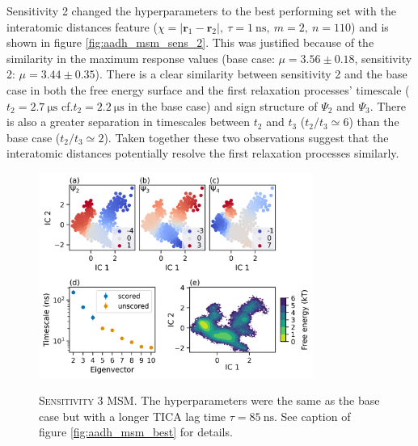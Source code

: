 Sensitivity 2 changed the hyperparameters to the best performing set with the interatomic distances feature ($\chi = |\mathbf{r}_{1} - \mathbf{r}_{2}|,\ \tau = \SI{1}{\nano\second},\ m=2,\ n=110$) and is shown in figure \ref{fig:aadh_msm_sens_2}.  This was justified because of the similarity in the maximum response values (base case: $\mu=3.56 \pm 0.18$, sensitivity 2: $\mu=3.44 \pm 0.35$). There is a clear similarity between sensitivity 2 and the base case in both the free energy surface and the first relaxation processes' timescale ($t_{2} = \SI{2.7}{\micro\second}$ cf.$t_{2} = \SI{2.2}{\micro\second}$ in the base case) and sign structure of $\Psi_{2}$ and $\Psi_{3}$.  There is also a greater separation in timescales between $t_{2}$ and $t_{3}$ ($t_{2}/t_{3} \simeq 6$) than the base case ($t_{2}/t_{3} \simeq 2$). Taken together these two observations suggest that the interatomic distances potentially resolve the first relaxation processes similarly. 

\begin{figure}
    \centering
    \caption[Sensitivity 3 MSM]{\textsc{Sensitivity 3 MSM}. The hyperparameters were the same as the base case but with a  longer TICA lag time $\tau = \SI{85}{\nano\second}$.  See caption of figure \ref{fig:aadh_msm_best} for details.}
    \includegraphics[width=0.8\textwidth]{chapters/msm_optimization/figures/aadh_msm_sens_3.png}
    \label{fig:aadh_msm_sens_3}
\end{figure}

